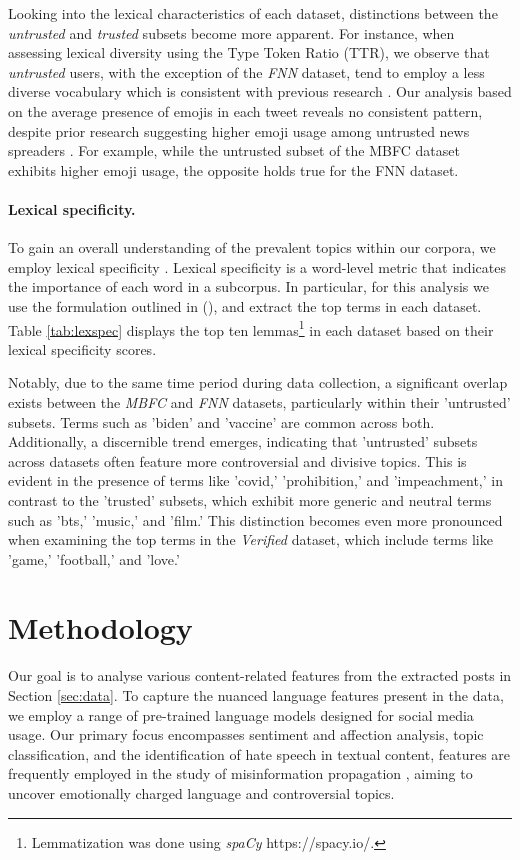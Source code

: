 Looking into the lexical characteristics of each dataset, distinctions between the \textit{untrusted} and \textit{trusted} subsets become more apparent. For instance, when assessing lexical diversity using the Type Token Ratio (TTR), we observe that \textit{untrusted} users, with the exception of the \textit{FNN} dataset, tend to employ a less diverse vocabulary which is consistent with previous research \cite{horne2017just}. %
Our analysis based on the average presence of emojis in each tweet reveals no consistent pattern, despite prior research suggesting higher emoji usage among untrusted news spreaders \cite{jarnas1087772}. For example, while the untrusted subset of the MBFC dataset exhibits higher emoji usage, the opposite holds true for the FNN dataset.



\paragraph{Lexical specificity.} To gain an overall understanding of the prevalent topics within our corpora, we employ lexical specificity \cite{lafon1980variabilite}. Lexical specificity is a word-level metric that indicates the importance of each word in a subcorpus. In particular, for this analysis we use the formulation outlined in \citeauthor{camacho2016nasari} (\citeyear{camacho2016nasari}), and extract the top terms in each dataset. Table \ref{tab:lexspec} displays the top ten lemmas\footnote{Lemmatization was done using \textit{spaCy} https://spacy.io/.} in each dataset based on their lexical specificity scores.


Notably, due to the same time period during data collection, a significant overlap exists between the \textit{MBFC} and \textit{FNN} datasets, particularly within their 'untrusted' subsets. Terms such as 'biden' and 'vaccine' are common across both. Additionally, a discernible trend emerges, indicating that 'untrusted' subsets across datasets often feature more controversial and divisive topics. This is evident in the presence of terms like 'covid,' 'prohibition,' and 'impeachment,' in contrast to the 'trusted' subsets, which exhibit more generic and neutral terms such as 'bts,' 'music,' and 'film.' This distinction becomes even more pronounced when examining the top terms in the \textit{Verified} dataset, which include terms like 'game,' 'football,' and 'love.'


\section{Methodology}
\label{sec:methodology}
Our goal is to analyse various content-related features from the extracted posts in Section \ref{sec:data}. To capture the nuanced language features present in the data, we employ a range of pre-trained language models designed for social media usage.  Our primary focus encompasses sentiment and affection analysis, topic classification, and the identification of hate speech in textual content, features are frequently employed in the study of misinformation propagation \cite{vicario2019polarization, verma2020understanding}, aiming to uncover emotionally charged language and controversial topics.

